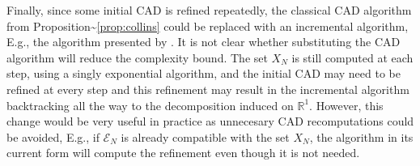 \documentclass[
]{book}
\theoremstyle{definition}
\theoremstyle{definition}
\theoremstyle{definition}
\theoremstyle{definition}
\theoremstyle{remark}
\begin{document}
Finally, since some initial CAD is refined repeatedly, the classical CAD algorithm from Proposition\textasciitilde{}\ref{prop:collins} could be replaced with an incremental algorithm, E.g., the algorithm presented by \citet{kremer2020}. It is not clear whether substituting the CAD algorithm will reduce the complexity bound. The set \(X_N\) is still computed at each step, using a singly exponential algorithm, and the initial CAD may need to be refined at every step and this refinement may result in the incremental algorithm backtracking all the way to the decomposition induced on \(\mathbb{R}^1\). However, this change would be very useful in practice as unnecesary CAD recomputations could be avoided, E.g., if \(\mathcal{E}_N\) is already compatible with the set \(X_N\), the algorithm in its current form will compute the refinement even though it is not needed.

  
\end{document}
